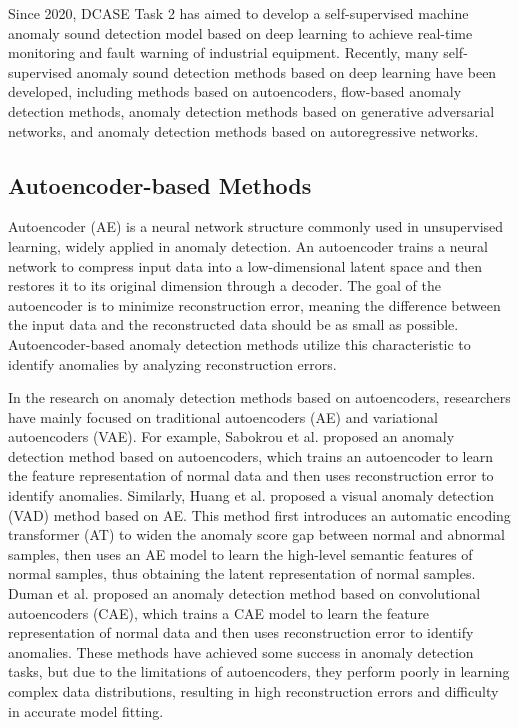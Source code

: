 \documentclass{article}
\begin{document}
Since 2020, DCASE Task 2\cite{DCASE2020Task2,DCASE2021Task2,DCASE2022Task2,DCASE2023Task2} has aimed to develop a self-supervised machine anomaly sound detection model based on deep learning\cite{DeepLearning-1,DeepLearning-2,DeepLearning-3} to achieve real-time monitoring and fault warning of industrial equipment. Recently, many self-supervised anomaly sound detection methods based on deep learning have been developed, including methods based on autoencoders\cite{AE-AD,AE-AD-2,CAE-AD,VAE-AD,VAE-AD-2,SAE-AD}, flow-based anomaly detection methods\cite{NF-AD,DifferNet,CFlow-AD}, anomaly detection methods based on generative adversarial networks\cite{AnoGAN,EGBAD,f-AnoGAN,GANomaly,AEGAN-AD}, and anomaly detection methods based on autoregressive networks\cite{AR-AD,WaveNet-AD}.

\subsection{Autoencoder-based Methods}

Autoencoder (AE) is a neural network structure commonly used in unsupervised learning, widely applied in anomaly detection. An autoencoder trains a neural network to compress input data into a low-dimensional latent space and then restores it to its original dimension through a decoder. The goal of the autoencoder is to minimize reconstruction error, meaning the difference between the input data and the reconstructed data should be as small as possible. Autoencoder-based anomaly detection methods utilize this characteristic to identify anomalies by analyzing reconstruction errors.

In the research on anomaly detection methods based on autoencoders, researchers have mainly focused on traditional autoencoders (AE)\cite{AE-AD} and variational autoencoders (VAE)\cite{VAE,VAE-AD}. For example, Sabokrou et al.\cite{AE-AD} proposed an anomaly detection method based on autoencoders, which trains an autoencoder to learn the feature representation of normal data and then uses reconstruction error to identify anomalies. Similarly, Huang et al.\cite{AE-AD-2} proposed a visual anomaly detection (VAD) method based on AE. This method first introduces an automatic encoding transformer (AT) to widen the anomaly score gap between normal and abnormal samples, then uses an AE model to learn the high-level semantic features of normal samples, thus obtaining the latent representation of normal samples. Duman et al.\cite{CAE-AD} proposed an anomaly detection method based on convolutional autoencoders (CAE), which trains a CAE model to learn the feature representation of normal data and then uses reconstruction error to identify anomalies. These methods have achieved some success in anomaly detection tasks, but due to the limitations of autoencoders, they perform poorly in learning complex data distributions, resulting in high reconstruction errors and difficulty in accurate model fitting.
\end{document}
